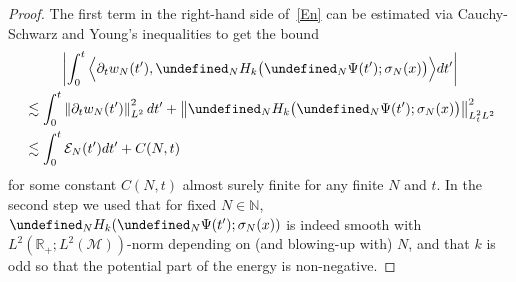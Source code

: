 \documentclass[10pt]{amsart}
\theoremstyle{definition}\newtheorem{defi}[theo]{Definition}\newtheorem{rema}[theo]{Remark}\newtheorem{exam}[theo]{Example}\newtheorem{exem}[theo]{Example}\newtheorem{nota}[theo]{Notation}
\newcommand{\R}{\mathbb{R}}
\newcommand{\N}{\mathbb{N}}
\let\P= \undefined
\newcommand{\P}{\mathbf{P}}
\newcommand{\En}{\mathcal{E}}
\newcommand{\M}{\mathcal{M}}
\newcommand{\s}{\sigma}
\newcommand{\dt}{\partial_t}
\newcommand{\les}{\lesssim}
\begin{document}
\begin{proof}
The first term in the right-hand side of~\eqref{En} can be estimated via Cauchy-Schwarz and Young's inequalities to get the bound
\begin{multline*}
\left|\int_0^t\Big\langle \dt w_N(t'), \P_NH_k\big(\P_N\Psi(t');\s_N(x)\big)\Big\rangle dt'\right|\\
\begin{aligned}
&\les \int_0^t\left\|\dt w_N(t')\right\|_{L^2}^2dt' + \big\|\P_NH_k\big(\P_N\Psi(t');\s_N(x)\big)\big\|_{L^2_tL^2}^2\\
&\les \int_0^t\En_N(t')dt' + C(N,t)
\end{aligned}
\end{multline*}
for some constant $C(N,t)$ almost surely finite for any finite $N$ and $t$. In the second step we used that for fixed $N\in\N$, $\P_NH_k(\P_N\Psi(t');\s_N(x))$ is indeed smooth with $L^2(\R_+;L^2(\M))$-norm depending on (and blowing-up with) $N$, and that $k$ is odd so that the potential part of the energy is non-negative.


\end{proof}
\end{document}
